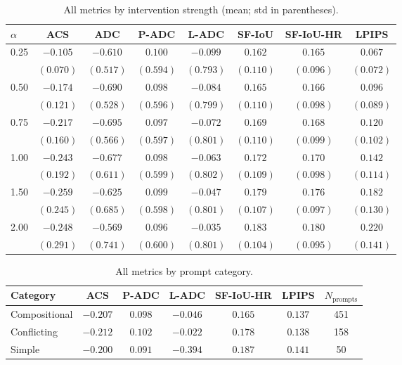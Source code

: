 \documentclass{article}
\begin{document}
\begin{table}[h]
\centering
\caption{All metrics by intervention strength (mean; std in parentheses).}
\small
\begin{tabular}{@{}lccccccc@{}}
\toprule
$\alpha$ & ACS & ADC & P-ADC & L-ADC & SF-IoU & SF-IoU-HR & LPIPS \\
\midrule
0.25 & $-0.105$ & $-0.610$ & $0.100$ & $-0.099$ & $0.162$ & $0.165$ & $0.067$ \\
     & $(0.070)$ & $(0.517)$ & $(0.594)$ & $(0.793)$ & $(0.110)$ & $(0.096)$ & $(0.072)$ \\[2pt]
0.50 & $-0.174$ & $-0.690$ & $0.098$ & $-0.084$ & $0.165$ & $0.166$ & $0.096$ \\
     & $(0.121)$ & $(0.528)$ & $(0.596)$ & $(0.799)$ & $(0.110)$ & $(0.098)$ & $(0.089)$ \\[2pt]
0.75 & $-0.217$ & $-0.695$ & $0.097$ & $-0.072$ & $0.169$ & $0.168$ & $0.120$ \\
     & $(0.160)$ & $(0.566)$ & $(0.597)$ & $(0.801)$ & $(0.110)$ & $(0.099)$ & $(0.102)$ \\[2pt]
1.00 & $-0.243$ & $-0.677$ & $0.098$ & $-0.063$ & $0.172$ & $0.170$ & $0.142$ \\
     & $(0.192)$ & $(0.611)$ & $(0.599)$ & $(0.802)$ & $(0.109)$ & $(0.098)$ & $(0.114)$ \\[2pt]
1.50 & $-0.259$ & $-0.625$ & $0.099$ & $-0.047$ & $0.179$ & $0.176$ & $0.182$ \\
     & $(0.245)$ & $(0.685)$ & $(0.598)$ & $(0.801)$ & $(0.107)$ & $(0.097)$ & $(0.130)$ \\[2pt]
2.00 & $-0.248$ & $-0.569$ & $0.096$ & $-0.035$ & $0.183$ & $0.180$ & $0.220$ \\
     & $(0.291)$ & $(0.741)$ & $(0.600)$ & $(0.801)$ & $(0.104)$ & $(0.095)$ & $(0.141)$ \\
\bottomrule
\end{tabular}
\end{table}

\begin{table}[h]
\centering
\caption{All metrics by prompt category.}
\small
\begin{tabular}{@{}lcccccc@{}}
\toprule
Category & ACS & P-ADC & L-ADC & SF-IoU-HR & LPIPS & $N_\text{prompts}$ \\
\midrule
Compositional & $-0.207$ & $0.098$ & $-0.046$ & $0.165$ & $0.137$ & 451 \\
Conflicting   & $-0.212$ & $0.102$ & $-0.022$ & $0.178$ & $0.138$ & 158 \\
Simple        & $-0.200$ & $0.091$ & $-0.394$ & $0.187$ & $0.141$ & 50  \\
\bottomrule
\end{tabular}
\end{table}
\end{document}
